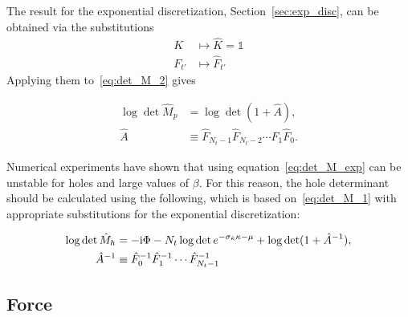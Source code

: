\documentclass[a4paper, fleqn, twoside, notitlepage]{scrartcl}
\begin{document}
\noindent
The result for the exponential discretization, Section~\ref{sec:exp_disc}, can be obtained via the substitutions
\begin{align}
  K &\mapsto \hat{K} = \mathds{1}\label{eq:exp_subs_K}\\
  F_{t'} &\mapsto \hat{F}_{t'}\label{eq:exp_subs_F}
\end{align}
Applying them to~\eqref{eq:det_M_2} gives
\begin{resultbox}
  \vspace{-\baselineskip}
  \begin{align}
    \log \det \hat{M}_p &= \log \det (1 + \hat{A}),\label{eq:det_M_exp}\\
    \hat{A} &\equiv \hat{F}_{N_t-1} \hat{F}_{N_t-2} \cdots \hat{F}_{1} \hat{F}_{0}.\label{eq:def_B}
  \end{align}
\end{resultbox}

\noindent
Numerical experiments have shown that using equation~\eqref{eq:det_M_exp} can be unstable for holes and large values of $\beta$.
For this reason, the hole determinant should be calculated using the following, which is based on~\eqref{eq:det_M_1} with appropriate substitutions for the exponential discretization:
\begin{resultbox}
  \vspace{-\baselineskip}
  \begin{align}
    \log \det \hat{M}_h &= -\mathrm{i} \Phi  - N_t \log \det e^{-\sigma_{\tilde{\kappa}}\kappa-\mu} + \log \det (1 + \hat{A}^{-1}),\label{eq:det_M_exp_h}\\
    \hat{A}^{-1} &\equiv \hat{F}_0^{-1} \hat{F}_1^{-1} \cdots \hat{F}_{N_t-1}^{-1}
  \end{align}
\end{resultbox}


\subsection{Force}
\end{document}
